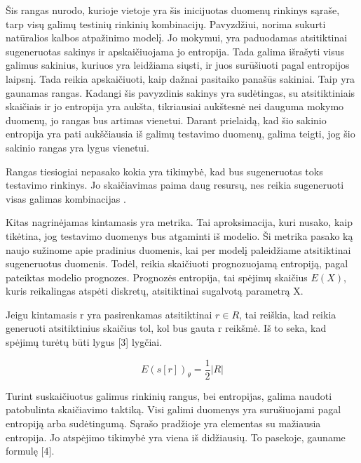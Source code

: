 \documentclass{VUMIFInfBakalaurinis}
\begin{document}
\par Šis rangas nurodo, kurioje vietoje yra šis inicijuotas duomenų rinkinys sąraše, tarp visų galimų testinių rinkinių kombinacijų. Pavyzdžiui, norima 
sukurti natūralios kalbos atpažinimo modelį. Jo mokymui, yra paduodamas atsitiktinai sugeneruotas sakinys  ir apskaičiuojama jo entropija. Tada galima išrašyti visus galimus sakinius, kuriuos yra leidžiama siųsti, ir juos surūšiuoti pagal entropijos laipsnį. Tada reikia apskaičiuoti, kaip dažnai pasitaiko panašūs sakiniai. Taip yra gaunamas rangas. Kadangi šis pavyzdinis sakinys yra sudėtingas, su atsitiktiniais skaičiais ir jo entropija yra aukšta, tikriausiai aukštesnė nei dauguma mokymo duomenų, jo rangas bus artimas vienetui. Darant prielaidą, kad šio sakinio entropija yra pati aukščiausia iš galimų testavimo duomenų, galima teigti, jog šio sakinio rangas yra lygus vienetui.
\par Rangas tiesiogiai nepasako kokia yra tikimybė, kad bus sugeneruotas toks testavimo rinkinys. Jo skaičiavimas paima daug resursų, nes reikia sugeneruoti visas galimas kombinacijas \cite{11}.
\par Kitas nagrinėjamas kintamasis yra  metrika. Tai aproksimacija, kuri nusako, kaip tikėtina, jog testavimo duomenys bus atgaminti iš modelio. Ši metrika pasako ką naujo sužinome apie pradinius duomenis, kai per modelį paleidžiame atsitiktinai sugeneruotus duomenis. Todėl, reikia skaičiuoti prognozuojamą entropiją, pagal pateiktas modelio prognozes. Prognozės entropija, tai spėjimų skaičius $E(X)$, kuris reikalingas atspėti diskretų, atsitiktinai sugalvotą parametrą X.
\par Jeigu kintamasis r yra pasirenkamas atsitiktinai $r \in R$, tai reiškia, kad reikia generuoti atsitiktinius skaičius tol, kol bus gauta r reikšmė. Iš to seka, kad spėjimų turėtų būti lygus [3] lygčiai. 

\begin{equation}
E(s[r])_{\theta} = \frac{1}{2} | R |
\label{eq:lygtis3}
\end{equation}

\par Turint suskaičiuotus galimus rinkinių rangus, bei entropijas, galima naudoti patobulinta skaičiavimo taktiką. Visi galimi duomenys yra surušiuojami pagal entropiją arba sudėtingumą. Sąrašo pradžioje yra elementas su mažiausia entropija. Jo atspėjimo tikimybė yra viena iš didžiausių. To pasekoje, gauname formulę [4].
\end{document}
